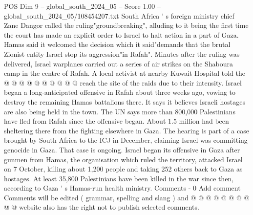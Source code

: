 \begin{textsample}{POS Dim 9 – global\_south\_2024\_05 – Score 1.00 – global\_south\_2024\_05/108454207.txt}
South Africa ' s foreign ministry chief Zane Dangor called the ruling"groundbreaking", alluding to it being the first time the court has made an explicit order to Israel to halt action in a part of Gaza.
Hamas said it welcomed the decision which it said"demands that the brutal Zionist entity Israel stop its aggression"in Rafah".
Minutes after the ruling was delivered, Israel warplanes carried out a series of air strikes on the Shaboura camp in the centre of Rafah.
A local activist at nearby Kuwait Hospital told the @ @ @ @ @ @ @ @ @ @ reach the site of the raids due to their intensity.
Israel began a long-anticipated offensive in Rafah about three weeks ago, vowing to destroy the remaining Hamas battalions there.
It says it believes Israeli hostages are also being held in the town.
The UN says more than 800,000 Palestinians have fled from Rafah since the offensive began.
About 1.5 million had been sheltering there from the fighting elsewhere in Gaza.
The hearing is part of a case brought by South Africa to the ICJ in December, claiming Israel was committing genocide in Gaza.
That case is ongoing.
Israel began its offensive in Gaza after gunmen from Hamas, the organisation which ruled the territory, attacked Israel on 7 October, killing about 1,200 people and taking 252 others back to Gaza as hostages.
At least 35,800 Palestinians have been killed in the war since then, according to Gaza ' s Hamas-run health ministry.
Comments - 0 Add comment Comments will be edited ( grammar, spelling and slang ) and @ @ @ @ @ @ @ @ @ @ website also has the right not to publish selected comments.

\end{textsample}
